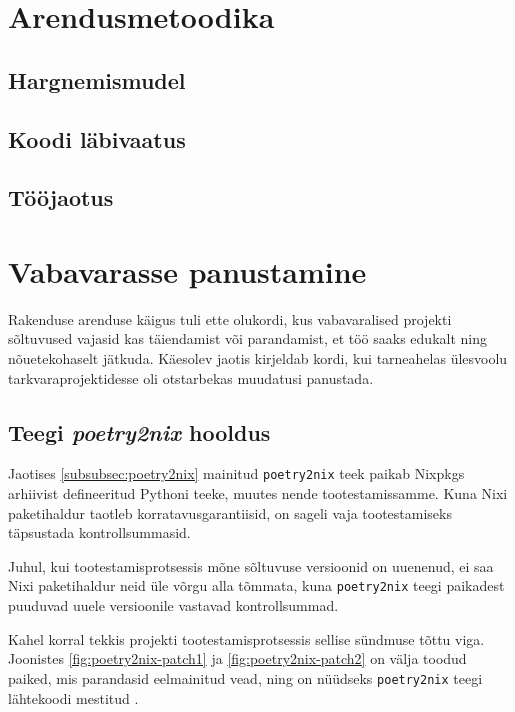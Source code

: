 \section{Arendusmetoodika}

\subsection{Hargnemismudel}

\subsection{Koodi läbivaatus}

\subsection{Tööjaotus}


\section{Vabavarasse panustamine}

Rakenduse arenduse käigus tuli ette olukordi, kus vabavaralised projekti sõltuvused vajasid kas täiendamist või parandamist, et töö saaks edukalt ning nõuetekohaselt jätkuda. Käesolev jaotis kirjeldab kordi, kui tarneahelas ülesvoolu tarkvaraprojektidesse oli otstarbekas muudatusi panustada.

\subsection{Teegi \emph{poetry2nix} hooldus}

Jaotises \ref{subsubsec:poetry2nix} mainitud \texttt{poetry2nix} teek paikab Nixpkgs arhiivist defineeritud Pythoni teeke, muutes nende tootestamissamme. Kuna Nixi paketihaldur taotleb korratavusgarantiisid, on sageli vaja tootestamiseks täpsustada kontrollsummasid.

Juhul, kui tootestamisprotsessis mõne sõltuvuse versioonid on uuenenud, ei saa Nixi paketihaldur neid üle võrgu alla tõmmata, kuna \texttt{poetry2nix} teegi paikadest puuduvad uuele versioonile vastavad kontrollsummad.

Kahel korral tekkis projekti tootestamisprotsessis sellise sündmuse tõttu viga. Joonistes \ref{fig:poetry2nix-patch1} ja \ref{fig:poetry2nix-patch2} on välja toodud paiked, mis parandasid eelmainitud vead, ning on nüüdseks \texttt{poetry2nix} teegi lähtekoodi mestitud \cite{poetry2nix-pr-1, poetry2nix-pr-2}.

